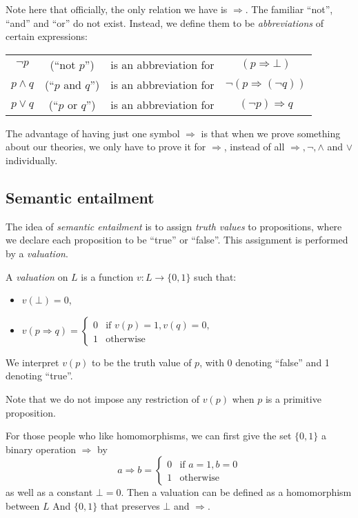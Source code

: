 \documentclass[a4paper]{article}
\begin{document}
Note here that officially, the only relation we have is $\Rightarrow$. The familiar ``not'', ``and'' and ``or'' do not exist. Instead, we define them to be \emph{abbreviations} of certain expressions:
\begin{defi}\leavevmode
  \begin{center}
    \begin{tabular}{cccc}
      $\neg p$ & (``not $p$'') & is an abbreviation for & $(p\Rightarrow \bot)$\\
      $p\wedge q$ & (``$p$ and $q$'') & is an abbreviation for & $\neg(p\Rightarrow (\neg q))$\\
      $p\vee q$ & (``$p$ or $q$'') & is an abbreviation for & $(\neg p)\Rightarrow q$
    \end{tabular}
  \end{center}
\end{defi}
The advantage of having just one symbol $\Rightarrow $ is that when we prove something about our theories, we only have to prove it for $\Rightarrow $, instead of all $\Rightarrow , \neg, \wedge$ and $\vee$ individually.
\subsection{Semantic entailment}
The idea of \emph{semantic entailment} is to assign \emph{truth values} to propositions, where we declare each proposition to be ``true'' or ``false''. This assignment is performed by a \emph{valuation}.

\begin{defi}[Valuation]
  A \emph{valuation} on $L$ is a function $v: L\to \{0, 1\}$ such that:
  \begin{itemize}
  \item $v(\bot) = 0$,
  \item $v(p\Rightarrow q) = \begin{cases} 0 & \text{if }v(p) = 1, v(q) = 0,\\1 & \text{otherwise}\end{cases}$
  \end{itemize}
  We interpret $v(p)$ to be the truth value of $p$, with 0 denoting ``false'' and 1 denoting ``true''.

  Note that we do not impose any restriction of $v(p)$ when $p$ is a primitive proposition.
\end{defi}
For those people who like homomorphisms, we can first give the set $\{0, 1\}$ a binary operation $\Rightarrow $ by
\[
  a\Rightarrow b = \begin{cases}
    0 & \text{if }a = 1, b = 0\\
    1 & \text{otherwise}
  \end{cases}
\]
as well as a constant $\bot = 0$. Then a valuation can be defined as a homomorphism between $L$ And $\{0, 1\}$ that preserves $\bot$ and $\Rightarrow $.
\end{document}
